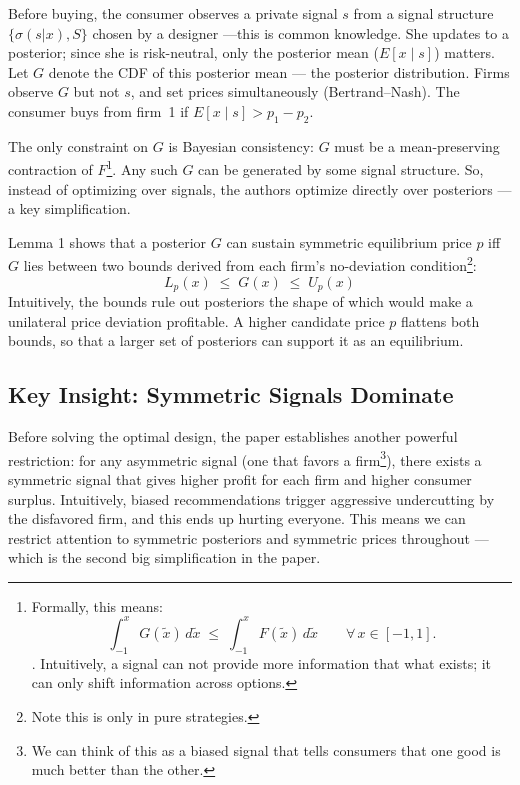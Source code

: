 \documentclass[12pt, a4paper]{article}
\begin{document}
Before buying, the consumer observes a private signal $s$ from a signal structure $\{\sigma(s|x), S\}$ chosen by a designer ---this is common knowledge. She updates to a posterior; since she is risk-neutral, only the posterior mean ($E[x \mid s]$) matters. Let $G$ denote the CDF of this posterior mean --- the posterior distribution. Firms observe $G$ but not $s$, and set prices simultaneously (Bertrand--Nash). The consumer buys from firm~1 if $E[x \mid s] > p_1 - p_2$.

The only constraint on $G$ is Bayesian consistency: $G$ must be a mean-preserving contraction of $F$\footnote{Formally, this means: 
$$\int_{-1}^{x} G(\tilde{x})\,d\tilde{x} \;\leq\; \int_{-1}^{x} F(\tilde{x})\,d\tilde{x} \qquad \forall\, x \in [-1,1].$$ . Intuitively, a signal can not provide more information that what exists; it can only shift information across options.}.
Any such $G$ can be generated by some signal structure. So, instead of optimizing over signals, the authors optimize directly over posteriors --- a key simplification.

Lemma 1 shows that a posterior $G$ can sustain symmetric equilibrium price $p$ iff $G$ lies between two bounds derived from each firm's no-deviation condition\footnote{Note this is only in pure strategies.}:
$$L_p(x) \;\leq\; G(x) \;\leq\; U_p(x)$$
Intuitively, the bounds rule out posteriors the shape of which would make a unilateral price deviation profitable. A higher candidate price $p$ flattens both bounds, so that a larger set of posteriors can support it as an equilibrium.



\subsection{Key Insight: Symmetric Signals Dominate}

Before solving the optimal design, the paper establishes another powerful restriction: for any asymmetric signal (one that favors a firm\footnote{We can think of this as a biased signal that tells consumers that one good is much better than the other.}), there exists a symmetric signal that gives higher profit for each firm and higher consumer surplus. Intuitively, biased recommendations trigger aggressive undercutting by the disfavored firm, and this ends up hurting everyone. This means we can restrict attention to symmetric posteriors and symmetric prices throughout ---which is the second big simplification in the paper.
\end{document}
